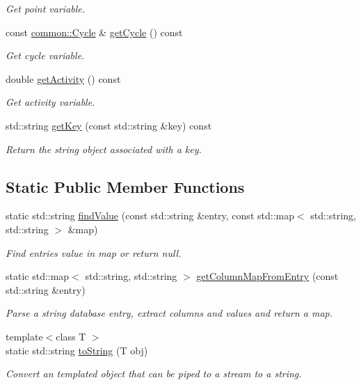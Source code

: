 \begin{DoxyCompactItemize}
\begin{DoxyCompactList}\small\item\em \-Get point variable. \end{DoxyCompactList}\item 
const \hyperlink{classcryomesh_1_1common_1_1Cycle}{common\-::\-Cycle} \& \hyperlink{classcryomesh_1_1manager_1_1NodeDatabaseObject_a55fe6f939ab39a2db10fcf27681ef39e}{get\-Cycle} () const 
\begin{DoxyCompactList}\small\item\em \-Get cycle variable. \end{DoxyCompactList}\item 
double \hyperlink{classcryomesh_1_1manager_1_1NodeDatabaseObject_ac5bc1d274dbaa92abaec9ed59e05d805}{get\-Activity} () const 
\begin{DoxyCompactList}\small\item\em \-Get activity variable. \end{DoxyCompactList}\item 
std\-::string \hyperlink{classcryomesh_1_1manager_1_1DatabaseObject_a66ded4e1a1bccd65c94922648c7135c5}{get\-Key} (const std\-::string \&key) const 
\begin{DoxyCompactList}\small\item\em \-Return the string object associated with a key. \end{DoxyCompactList}\end{DoxyCompactItemize}
\subsection*{\-Static \-Public \-Member \-Functions}
\begin{DoxyCompactItemize}
\item 
static std\-::string \hyperlink{classcryomesh_1_1manager_1_1DatabaseObject_aa4ef26ce91fea092f146e67add491e0f}{find\-Value} (const std\-::string \&entry, const std\-::map$<$ std\-::string, std\-::string $>$ \&map)
\begin{DoxyCompactList}\small\item\em \-Find entries value in map or return null. \end{DoxyCompactList}\item 
static std\-::map$<$ std\-::string, \*
std\-::string $>$ \hyperlink{classcryomesh_1_1manager_1_1DatabaseObject_a04ce7c34b51e3290c972121cf2f16565}{get\-Column\-Map\-From\-Entry} (const std\-::string \&entry)
\begin{DoxyCompactList}\small\item\em \-Parse a string database entry, extract columns and values and return a map. \end{DoxyCompactList}\item 
{\footnotesize template$<$class T $>$ }\\static std\-::string \hyperlink{classcryomesh_1_1manager_1_1DatabaseObject_a1b37d9d07009ae1c71f644761d36b468}{to\-String} (\-T obj)
\begin{DoxyCompactList}\small\item\em \-Convert an templated object that can be piped to a stream to a string. \end{DoxyCompactList}\end{DoxyCompactItemize}
